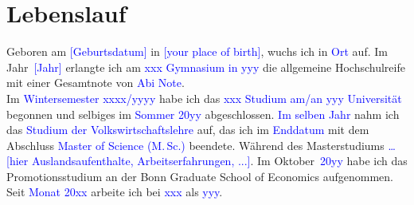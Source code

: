 \documentclass[11pt, a4paper, twoside]{article}
\begin{document}
\section*{Lebenslauf}

Geboren am \textcolor{blue}{[Geburtsdatum]} in \textcolor{blue}{[your place of birth]},
wuchs ich in \textcolor{blue}{Ort} auf. Im Jahr~\textcolor{blue}{[Jahr]} erlangte ich am
\textcolor{blue}{xxx Gymnasium in yyy} die allgemeine Hoch\-schul\-reife mit einer
Gesamtnote von \textcolor{blue}{Abi Note}. \\

Im \textcolor{blue}{Winter\-semester xxxx/yyyy} habe ich das \textcolor{blue}{xxx
Studium am/an yyy Universität} begonnen und selbiges im \textcolor{blue}{Sommer 20yy}
abgeschlossen. \textcolor{blue}{Im selben Jahr} nahm ich das \textcolor{blue}{Studium
der Volks\-wirt\-schafts\-lehre} auf, das ich im \textcolor{blue}{Enddatum} mit dem
Abschluss \textcolor{blue}{Master of Science (M.\,Sc.)} beendete. W\"ahrend des
Masterstudiums \textcolor{blue}{\ldots [hier Auslandsaufenthalte, Arbeitserfahrungen,
...]}. Im Oktober~\textcolor{blue}{20yy} habe ich das Promo\-tions\-studium an der Bonn
Graduate School of Economics aufgenommen. \\

Seit \textcolor{blue}{Monat 20xx} arbeite ich bei \textcolor{blue}{xxx} als
\textcolor{blue}{yyy}. 
\end{document}

